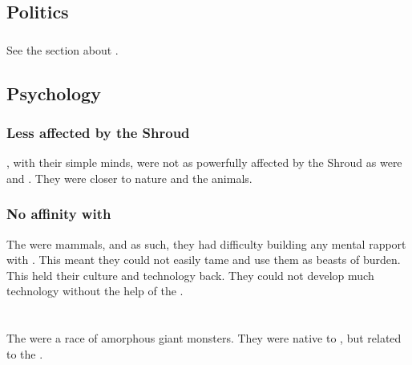 \subsection{Politics}





\subsubsection{\Aryothim}
See the section about . 









\subsection{Psychology}





\subsubsection{Less affected by the Shroud}
\Nephilim, with their simple minds, were not as powerfully affected by the Shroud as were \scathae and \humans.
They were closer to nature and the animals. 





\subsubsection{No affinity with \saurians}
The \nephilim were mammals, and as such, they had difficulty building any mental rapport with \saurians.
This meant they could not easily tame \saurians and use them as beasts of burden.
This held their culture and technology back.
They could not develop much technology without the help of the \ophidians. 















\section{\Noggyal}
\index{\noggyal}
The \noggyaleth{} were a race of amorphous giant monsters. 
They were native to \Miith, but related to the \banes. 









